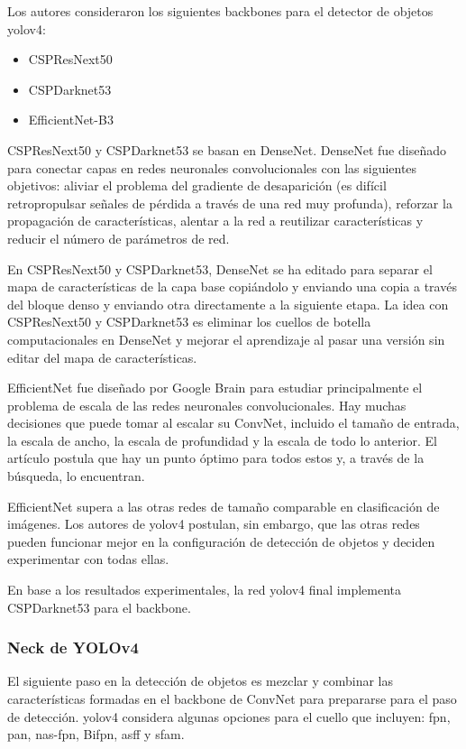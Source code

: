 Los autores consideraron los siguientes backbones para el detector de objetos \gls{yolov4}:

\begin{itemize}
    \item CSPResNext50
    \item CSPDarknet53
    \item EfficientNet-B3
\end{itemize}

CSPResNext50 y CSPDarknet53 se basan en DenseNet. DenseNet fue diseñado para conectar capas en redes neuronales convolucionales con las siguientes objetivos: aliviar el problema del gradiente de desaparición (es difícil retropropulsar señales de pérdida a través de una red muy profunda), reforzar la propagación de características, alentar a la red a reutilizar características y reducir el número de parámetros de red.

En CSPResNext50 y CSPDarknet53, DenseNet se ha editado para separar el mapa de características de la capa base copiándolo y enviando una copia a través del bloque denso y enviando otra directamente a la siguiente etapa. La idea con CSPResNext50 y CSPDarknet53 es eliminar los cuellos de botella computacionales en DenseNet y mejorar el aprendizaje al pasar una versión sin editar del mapa de características.

EfficientNet fue diseñado por Google Brain para estudiar principalmente el problema de escala de las redes neuronales convolucionales. Hay muchas decisiones que puede tomar al escalar su ConvNet, incluido el tamaño de entrada, la escala de ancho, la escala de profundidad y la escala de todo lo anterior. El artículo \cite{tan2020efficientdet} postula que hay un punto óptimo para todos estos y, a través de la búsqueda, lo encuentran.

EfficientNet supera a las otras redes de tamaño comparable en clasificación de imágenes. Los autores de \gls{yolov4} postulan, sin embargo, que las otras redes pueden funcionar mejor en la configuración de detección de objetos y deciden experimentar con todas ellas.

En base a los resultados experimentales, la red \gls{yolov4} final implementa CSPDarknet53 para el backbone.

\subsubsection*{Neck de YOLOv4}
\label{subsubsec:yolov4-neck}

El siguiente paso en la detección de objetos es mezclar y combinar las características formadas en el backbone de ConvNet para prepararse para el paso de detección. \gls{yolov4} considera algunas opciones para el cuello que incluyen: \gls{fpn}, \gls{pan}, \gls{nas}-\gls{fpn}, Bi\gls{fpn}, \gls{asff} y \gls{sfam}.



